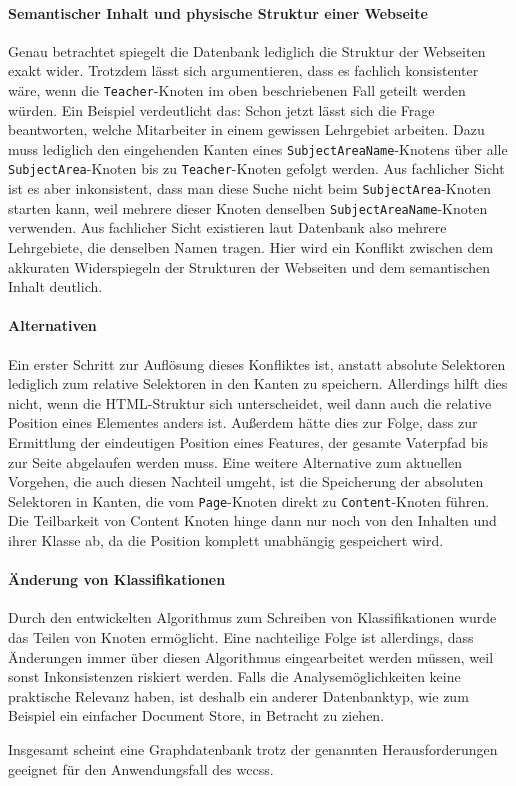     \paragraph*{Semantischer Inhalt und physische Struktur einer Webseite}
    Genau betrachtet spiegelt die Datenbank lediglich die Struktur der Webseiten exakt wider.
    Trotzdem lässt sich argumentieren, dass es fachlich konsistenter wäre,
    wenn die \texttt{Teacher}-Knoten im oben beschriebenen Fall geteilt werden würden.
    Ein Beispiel verdeutlicht das:
    Schon jetzt lässt sich die Frage beantworten,
    welche Mitarbeiter in einem gewissen Lehrgebiet arbeiten.
    Dazu muss lediglich den eingehenden Kanten eines
    \texttt{SubjectAreaName}-Knotens über alle \texttt{SubjectArea}-Knoten
    bis zu \texttt{Teacher}-Knoten gefolgt werden.
    Aus fachlicher Sicht ist es aber inkonsistent,
    dass man diese Suche nicht beim \texttt{SubjectArea}-Knoten
    starten kann, weil mehrere dieser Knoten denselben
    \texttt{SubjectAreaName}-Knoten verwenden.
    Aus fachlicher Sicht existieren laut Datenbank also mehrere Lehrgebiete,
    die denselben Namen tragen.
    Hier wird ein Konflikt zwischen dem akkuraten Widerspiegeln der Strukturen der Webseiten
    und dem semantischen Inhalt deutlich.

    \paragraph*{Alternativen}
    Ein erster Schritt zur Auflösung dieses Konfliktes ist, anstatt absolute Selektoren
    lediglich zum {\parentFeature} relative Selektoren in den Kanten zu speichern.
    Allerdings hilft dies nicht, wenn die HTML-Struktur sich unterscheidet,
    weil dann auch die relative Position eines Elementes anders ist.
    Außerdem hätte dies zur Folge, dass zur Ermittlung der eindeutigen Position
    eines Features, der gesamte Vaterpfad bis zur Seite abgelaufen werden muss.
    Eine weitere Alternative zum aktuellen Vorgehen,
    die auch diesen Nachteil umgeht,
    ist die Speicherung der absoluten Selektoren in Kanten,
    die vom \texttt{Page}-Knoten direkt zu \texttt{Content}-Knoten führen.
    Die Teilbarkeit von Content Knoten hinge dann nur noch von den Inhalten und ihrer Klasse ab,
    da die Position komplett unabhängig gespeichert wird.

    \paragraph*{Änderung von Klassifikationen}
    Durch den entwickelten Algorithmus zum Schreiben von Klassifikationen
    wurde das Teilen von Knoten ermöglicht.
    Eine nachteilige Folge ist allerdings,
    dass Änderungen immer über diesen Algorithmus eingearbeitet werden müssen,
    weil sonst Inkonsistenzen riskiert werden.
    Falls die Analysemöglichkeiten keine praktische Relevanz haben,
    ist deshalb ein anderer Datenbanktyp, wie zum Beispiel ein einfacher Document Store,
    in Betracht zu ziehen.

    Insgesamt scheint eine Graphdatenbank trotz der genannten Herausforderungen geeignet
    für den Anwendungsfall des \glspl{wccs}.
